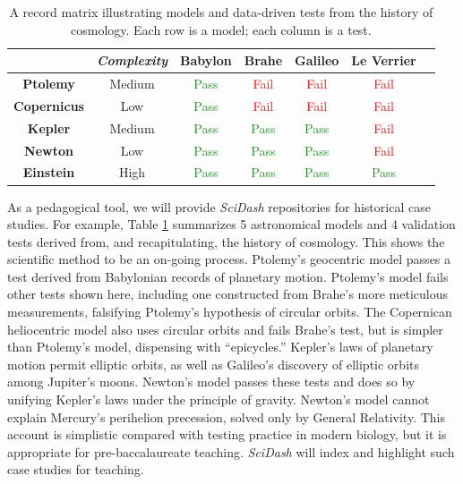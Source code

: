 \documentclass[11pt,letterpaper]{article}
\begin{document}
\begin{table}
\vspace{-7px}
\caption{A record matrix illustrating models and data-driven tests from the history of cosmology. Each row is a model; each column is a test.}
\label{table:record_matrix}
\begin{tabular}{| c | c | c | c | c | c | c }
\hline
    & \textit{Complexity} & \textbf{Babylon} & \textbf{Brahe} & \textbf{Galileo} & \textbf{Le Verrier} \\ \hline
  \textbf{Ptolemy} & Medium & \textcolor{ForestGreen}{Pass} & \textcolor{Red}{Fail} & \textcolor{Red}{Fail} & \textcolor{Red}{Fail} \\ \hline
  \textbf{Copernicus} & Low & \textcolor{ForestGreen}{Pass} & \textcolor{Red}{Fail} & \textcolor{Red}{Fail} & \textcolor{Red}{Fail} \\ \hline
  \textbf{Kepler} & Medium & \textcolor{ForestGreen}{Pass} & \textcolor{ForestGreen}{Pass} & \textcolor{ForestGreen}{Pass} & \textcolor{Red}{Fail} \\ \hline
  \textbf{Newton} & Low & \textcolor{ForestGreen}{Pass} & \textcolor{ForestGreen}{Pass} & \textcolor{ForestGreen}{Pass} & \textcolor{Red}{Fail} \\ \hline
  \textbf{Einstein} & High & \textcolor{ForestGreen}{Pass} & \textcolor{ForestGreen}{Pass} & \textcolor{ForestGreen}{Pass} & \textcolor{ForestGreen}{Pass} \\ \hline
\end{tabular}
\end{table}
\leavevmode
\leavevmode
\leavevmode

As a pedagogical tool, we will provide \textit{SciDash} repositories for historical case studies. 
For example, Table \ref{table:record_matrix} summarizes 5 astronomical models and 4 validation tests derived from, and recapitulating, the history of cosmology. 
This shows the scientific method to be an on-going process. 
Ptolemy's geocentric model\cite{ptolemy_almagest_150} passes a test derived from Babylonian records of planetary motion. 
Ptolemy's model fails other tests shown here, including one constructed from Brahe's more meticulous measurements\cite{kepler_rudolphine_1627}, falsifying Ptolemy's hypothesis of circular orbits. 
The Copernican heliocentric model\cite{copernicus_revolutionibus_1543} also uses circular orbits and fails Brahe's test, but is simpler than Ptolemy's model, dispensing with ``epicycles.'' 
Kepler's laws of planetary motion permit elliptic orbits\cite{kepler_astronomia_1609}, as well as Galileo's discovery of elliptic orbits among Jupiter's moons\cite{galilei_siderius_1610}. 
Newton's model passes these tests and does so by unifying Kepler's laws under the principle of gravity\cite{newton_philosophiae_1687}. 
Newton's model cannot explain Mercury's perihelion precession\cite{le_verrier_lettre_1859}, solved only by General Relativity\cite{einstein_foundation_1916}. 
This account is simplistic compared with testing practice in modern biology, but it is appropriate for pre-baccalaureate teaching. 
\textit{SciDash} will index and highlight such case studies for teaching.  



\end{document}
